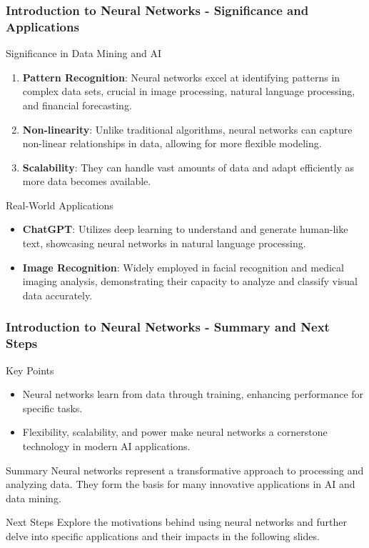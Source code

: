\documentclass[aspectratio=169]{beamer}
\begin{document}
\begin{frame}[fragile]
    \frametitle{Introduction to Neural Networks - Significance and Applications}
    \begin{block}{Significance in Data Mining and AI}
        \begin{enumerate}
            \item \textbf{Pattern Recognition}: Neural networks excel at identifying patterns in complex data sets, crucial in image processing, natural language processing, and financial forecasting.
            \item \textbf{Non-linearity}: Unlike traditional algorithms, neural networks can capture non-linear relationships in data, allowing for more flexible modeling.
            \item \textbf{Scalability}: They can handle vast amounts of data and adapt efficiently as more data becomes available.
        \end{enumerate}
    \end{block}

    \begin{block}{Real-World Applications}
        \begin{itemize}
            \item \textbf{ChatGPT}: Utilizes deep learning to understand and generate human-like text, showcasing neural networks in natural language processing.
            \item \textbf{Image Recognition}: Widely employed in facial recognition and medical imaging analysis, demonstrating their capacity to analyze and classify visual data accurately.
        \end{itemize}
    \end{block}
\end{frame}

\begin{frame}[fragile]
    \frametitle{Introduction to Neural Networks - Summary and Next Steps}
    \begin{block}{Key Points}
        \begin{itemize}
            \item Neural networks learn from data through training, enhancing performance for specific tasks.
            \item Flexibility, scalability, and power make neural networks a cornerstone technology in modern AI applications.
        \end{itemize}
    \end{block}

    \begin{block}{Summary}
        Neural networks represent a transformative approach to processing and analyzing data. They form the basis for many innovative applications in AI and data mining.
    \end{block}

    \begin{block}{Next Steps}
        Explore the motivations behind using neural networks and further delve into specific applications and their impacts in the following slides.
    \end{block}
\end{frame}
\end{document}
